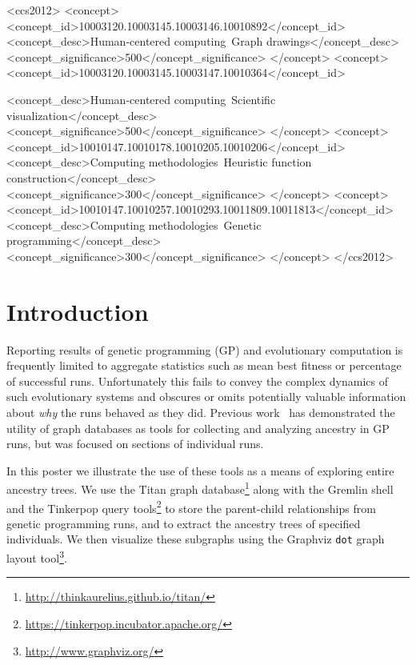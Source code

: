 \documentclass{sig-alternate}
\begin{document}
\begin{CCSXML}
	<ccs2012>
	<concept>
	<concept_id>10003120.10003145.10003146.10010892</concept_id>
	<concept_desc>Human-centered computing~Graph drawings</concept_desc>
	<concept_significance>500</concept_significance>
	</concept>
	<concept>
	<concept_id>10003120.10003145.10003147.10010364</concept_id>

	<concept_desc>Human-centered computing~Scientific visualization</concept_desc>
	<concept_significance>500</concept_significance>
	</concept>
	<concept>
	<concept_id>10010147.10010178.10010205.10010206</concept_id>
	<concept_desc>Computing methodologies~Heuristic function construction</concept_desc>
	<concept_significance>300</concept_significance>
	</concept>
	<concept>
	<concept_id>10010147.10010257.10010293.10011809.10011813</concept_id>
	<concept_desc>Computing methodologies~Genetic programming</concept_desc>
	<concept_significance>300</concept_significance>
	</concept>
	</ccs2012>
\end{CCSXML}


\printccsdesc


\section{Introduction}
\label{sec:introduction}


Reporting results of genetic programming (GP) and evolutionary computation is frequently limited to aggregate statistics such as mean best fitness or percentage of successful runs. Unfortunately this fails to convey the complex dynamics of such evolutionary systems and obscures or omits potentially valuable information about \emph{why} the runs behaved as they did. Previous work~\cite{McPhee:2015:GPTP} has demonstrated the utility of graph databases as tools for collecting and analyzing ancestry in GP runs, but was focused on sections of individual runs.

In this poster we illustrate the use of these tools as a means of exploring entire ancestry trees. We use the Titan graph database\footnote{\url{http://thinkaurelius.github.io/titan/}} along with the Gremlin shell and the Tinkerpop query tools\footnote{\url{https://tinkerpop.incubator.apache.org/}} to store the parent-child relationships from genetic programming runs, and to extract the ancestry trees of specified individuals. We then visualize these subgraphs using the Graphviz \texttt{dot} graph layout tool\footnote{\url{http://www.graphviz.org/}}.
\end{document}
